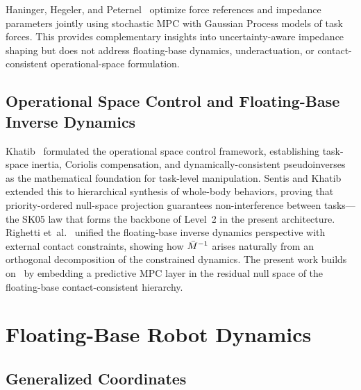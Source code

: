 Haninger, Hegeler, and Peternel~\cite{haninger2022model} optimize force
references and impedance parameters jointly using stochastic MPC with
Gaussian Process models of task forces.
This provides complementary insights into uncertainty-aware impedance
shaping but does not address floating-base dynamics, underactuation, or
contact-consistent operational-space formulation.

\subsection{Operational Space Control and Floating-Base Inverse Dynamics}

Khatib~\cite{khatib1987unified} formulated the operational space control
framework, establishing task-space inertia, Coriolis compensation, and
dynamically-consistent pseudoinverses as the mathematical foundation for
task-level manipulation.
Sentis and Khatib~\cite{sentis2005synthesis} extended this to hierarchical
synthesis of whole-body behaviors, proving that priority-ordered null-space
projection guarantees non-interference between tasks---the SK05 law that
forms the backbone of Level~2 in the present architecture.
Righetti et~al.~\cite{righetti2011inverse} unified the floating-base
inverse dynamics perspective with external contact constraints, showing how
$\bar{M}^{-1}$ arises naturally from an orthogonal decomposition of the constrained
dynamics.
The present work builds on~\cite{khatib1987unified,sentis2005synthesis,righetti2011inverse}
by embedding a predictive MPC layer in the residual null space of the
floating-base contact-consistent hierarchy.

\section{Floating-Base Robot Dynamics}\label{sec:dynamics}

\subsection{Generalized Coordinates}

